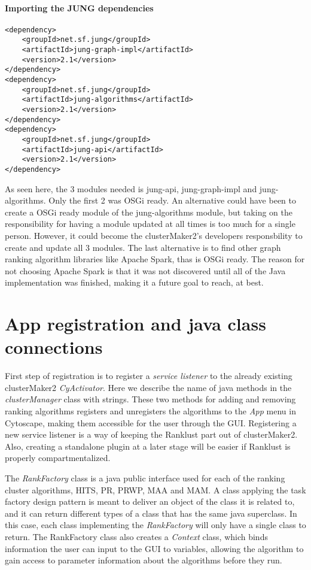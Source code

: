 \paragraph{Importing the JUNG dependencies}
\begin{verbatim}
<dependency>
    <groupId>net.sf.jung</groupId>
    <artifactId>jung-graph-impl</artifactId>
    <version>2.1</version>
</dependency>
<dependency>
    <groupId>net.sf.jung</groupId>
    <artifactId>jung-algorithms</artifactId>
    <version>2.1</version>
</dependency>
<dependency>
    <groupId>net.sf.jung</groupId>
    <artifactId>jung-api</artifactId>
    <version>2.1</version>
</dependency>
\end{verbatim}

As seen here, the 3 modules needed is jung-api, jung-graph-impl and
jung-algorithms. Only the first 2 was OSGi ready. An alternative could have been
to create a OSGi ready module of the jung-algorithms module, but taking on the
responsibility for having a module updated at all times is too much for a single
person. However, it could become the clusterMaker2's developers responsbility to
create and update all 3 modules. The last alternative is to find other graph
ranking algorithm libraries like Apache Spark\cite{spark}, thas is OSGi ready.
The reason for not choosing Apache Spark is that it was not discovered until all
of the Java implementation was finished, making it a future goal to reach, at
best.

\section{App registration and java class connections}
First step of registration is to register a \textit{service listener} to the
already existing clusterMaker2 \textit{CyActivator}. Here we describe the name
of java methods in the \textit{clusterManager} class with strings. These two
methods for adding and removing ranking algorithms registers and unregisters the
algorithms to the \textit{App} menu in Cytoscape, making them accessible for the
user through the GUI. Registering a new service listener is a way of keeping the
Ranklust part out of clusterMaker2. Also, creating a standalone plugin at
a later stage will be easier if Ranklust is properly compartmentalized.


The \textit{RankFactory} class is a java public interface used for each of the
ranking cluster algorithms, HITS, PR, PRWP, MAA and MAM. A class applying the
task factory design pattern is meant to deliver an object of the class it is
related to\cite{factory-design}, and it can return different types of a class
that has the same java superclass\cite{java-superclass}. In this case, each
class implementing the \textit{RankFactory} will only have a single class to
return. The RankFactory class also creates a \textit{Context} class, which binds
information the user can input to the GUI to variables, allowing the algorithm
to gain access to parameter information about the algorithms before they run.

